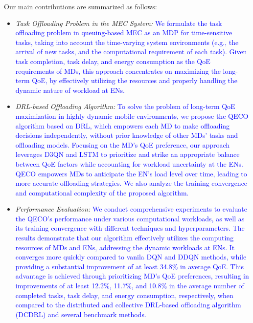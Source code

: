 \documentclass[10pt, journal,letterpaper]{IEEEtran}
\begin{document}
Our main contributions are summarized as follows:

\begin{itemize}
	\item \textit{Task Offloading Problem in the MEC System:} \textcolor{blue}{ We formulate the task offloading problem in queuing-based MEC as an MDP for time-sensitive tasks, taking into account the time-varying system environments (e.g., the arrival of new tasks, and the computational requirement of each task). Given task completion, task delay, and energy consumption as the QoE requirements of MDs, this approach concentrates on maximizing the long-term QoE, by effectively utilizing the resources and properly handling the dynamic nature of workload at ENs.}
	
	 
	 
	 \item \textit{DRL-based Offloading Algorithm:} \textcolor{blue}{To solve the problem of long-term QoE maximization in highly dynamic mobile environments, we propose the QECO algorithm based on DRL, which empowers each MD to make offloading decisions independently, without prior knowledge of other MDs' tasks and offloading models. Focusing on the MD's QoE preference, our approach leverages D3QN and LSTM to prioritize and strike an appropriate balance between QoE factors while accounting for workload uncertainty at the ENs. QECO empowers MDs to anticipate the EN's load level over time, leading to more accurate offloading strategies. We also analyze the training convergence and computational complexity of the proposed algorithm.}

	\item \textit{Performance Evaluation:} \textcolor{blue}{We conduct comprehensive experiments to evaluate the QECO's performance under various computational workloads, as well as its training convergence with different techniques and hyperparameters. The results demonstrate that our algorithm effectively utilizes the computing resources of MDs and ENs, addressing the dynamic workloads at ENs. It converges more quickly compared to vanila DQN and DDQN methods, while providing a substantial improvement of at least 34.8\% in average QoE. This advantage is achieved through prioritizing MD's QoE preferences, resulting in improvements of at least 12.2\%, 11.7\%, and 10.8\% in the average number of completed tasks, task delay, and energy consumption, respectively, when compared to the distributed and collective DRL-based offloading algorithm (DCDRL) \cite{qiu2020distributed} and several benchmark methods.}
	
	
	
\end{itemize}
\end{document}
